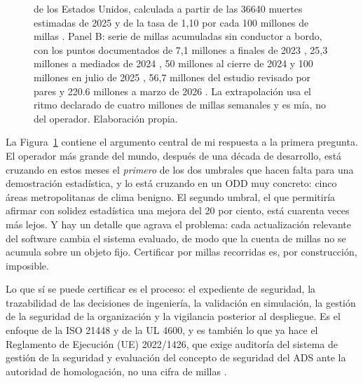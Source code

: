 \documentclass[11pt,letterpaper]{article}
\begin{document}
\begin{figure}[tbp]
{  de los Estados Unidos, calculada a partir de las \num{36640} muertes estimadas
  de 2025 y de la tasa de 1,10 por cada 100 millones de millas
  \parencite{nhtsa2026early}. Panel B: serie de millas acumuladas sin conductor
  a bordo, con los puntos documentados de 7,1 millones a finales de 2023
  \parencite{kusano2024}, 25,3 millones a mediados de 2024
  \parencite{dilillo2024}, 50 millones al cierre de 2024 y 100 millones en julio
  de 2025 \parencite{robotreport2025}, 56,7 millones del estudio revisado por
  pares \parencite{kusano2025} y \num{220.6} millones a marzo de 2026
  \parencite{waymoimpact2026}. La extrapolación usa el ritmo declarado de cuatro
  millones de millas semanales y es mía, no del operador. Elaboración propia.}
  \label{fig:validacion}
\end{figure}

La Figura~\ref{fig:validacion} contiene el argumento central de mi respuesta a
la primera pregunta. El operador más grande del mundo, después de una década de
desarrollo, está cruzando en estos meses el \emph{primero} de los dos umbrales
que hacen falta para una demostración estadística, y lo está cruzando en un ODD
muy concreto: cinco áreas metropolitanas de clima benigno. El segundo umbral, el
que permitiría afirmar con solidez estadística una mejora del 20 por ciento,
está cuarenta veces más lejos. Y hay un detalle que agrava el problema: cada
actualización relevante del software cambia el sistema evaluado, de modo que la
cuenta de millas no se acumula sobre un objeto fijo. Certificar por millas
recorridas es, por construcción, imposible.

Lo que sí se puede certificar es el proceso: el expediente de seguridad, la
trazabilidad de las decisiones de ingeniería, la validación en simulación, la
gestión de la seguridad de la organización y la vigilancia posterior al
despliegue. Es el enfoque de la ISO 21448 y de la UL 4600, y es también lo que ya
hace el Reglamento de Ejecución (UE) 2022/1426, que exige auditoría del sistema
de gestión de la seguridad y evaluación del concepto de seguridad del ADS ante la
autoridad de homologación, no una cifra de millas \parencite{eu2022reg}.
\end{document}
